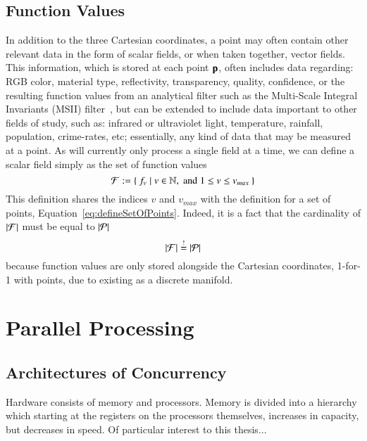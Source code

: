 %
%
%
\subsection{Function Values}
\label{ch2s3ssFV}
In addition to the three Cartesian coordinates, a point may often contain other relevant data in the form of scalar fields, or when taken together, vector fields. This information, which is stored at each point $\mathbf{p}$, often includes data regarding: RGB color, material type, reflectivity, transparency, quality, confidence, or the resulting function values from an analytical filter such as the Multi-Scale Integral Invariants (MSII) filter~\cite[p.~21]{Mara12}, but can be extended to include data important to other fields of study, such as: infrared or ultraviolet light, temperature, rainfall, population, crime-rates, etc; essentially, any kind of data that may be measured at a point. As  will currently only process a single field at a time, we can define a scalar field simply as the set of function values
%
\begin{equation}
	\mathcal{F} := \left \{\: f_v \mid v \in \mathbb{N}, \;\text{and}\; 1\leq v \leq v_{max} \:\right \}
	\label{eq:defineSetOfFunctionValues}
\end{equation}%
%
%
%
This definition shares the indices $v$ and $v_{max}$ with the definition for a set of points, Equation~\ref{eq:defineSetOfPoints}. Indeed, it is a fact that the cardinality of $|\mathcal{F}|$ must be equal to $|\mathcal{P}|$
%
\begin{equation}
	|\mathcal{F}| \overset{!}{=} |\mathcal{P}|
\end{equation}
%
because function values are only stored alongside the Cartesian coordinates, 1-for-1 with points, due to \tdd{} existing as a discrete manifold.

%
%
%
%
%
\section{Parallel Processing}
\label{ch2sPP}

%
\subsection{Architectures of Concurrency}
Hardware consists of memory and processors. Memory is divided into a hierarchy which starting at the registers on the processors themselves, increases in capacity, but decreases in speed. Of particular interest to this thesis...

